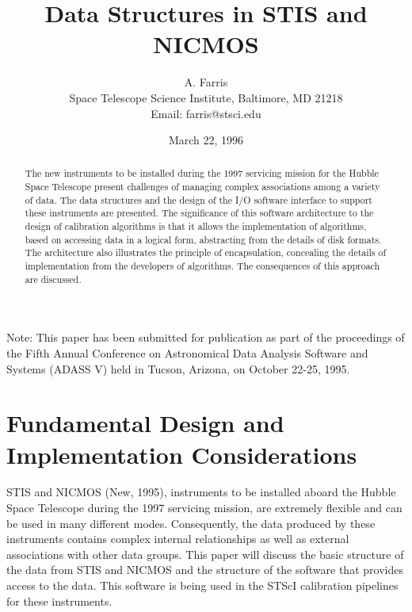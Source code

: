 


\title{Data Structures in STIS and NICMOS}
\author{A. Farris\\ Space Telescope Science Institute, Baltimore, MD 21218\\
Email: farris@stsci.edu}
\date{March 22, 1996}
\maketitle

\begin{abstract}
The new instruments to be installed during the 1997 servicing mission
for the Hubble Space Telescope present challenges of managing complex
associations among a variety of data.  The data structures and the
design of the I/O software interface to support these instruments are
presented.  The significance of this software architecture to the
design of calibration algorithms is that it allows the implementation of
algorithms, based on accessing data in a logical form, abstracting from
the details of disk formats.  The architecture also illustrates the
principle of encapsulation, concealing the details of implementation
from the developers of algorithms.  The consequences of this approach
are discussed. 
\end{abstract}


Note: This paper has been submitted for publication as part of the
proceedings of the Fifth Annual Conference on Astronomical Data Analysis
Software and Systems (ADASS V) held in Tucson, Arizona, on October 22-25,
1995. 

\section{Fundamental Design and Implementation Considerations}

STIS and NICMOS (New, 1995), instruments to be installed aboard the
Hubble Space Telescope during the 1997 servicing mission, are extremely
flexible and can be used in many different modes.  Consequently, the
data produced by these instruments contains complex internal
relationships as well as external associations with other data groups. 
This paper will discuss the basic structure of the data from STIS and
NICMOS and the structure of the software that provides access to the data.
This software is being used in the STScI calibration pipelines for these
instruments. 

